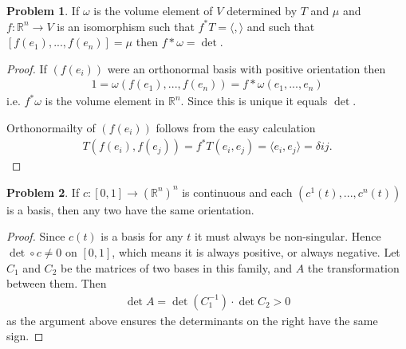\documentclass[20pt]{article}
\theoremstyle{plain}
\theoremstyle{definition}
\newtheorem*{problem}{Problem}
\newcommand{\reals}{\mathbb{R}}
\begin{document}
\begin{problem}{4.4}
  If $\omega$ is the volume element of $V$ determined by $T$ and $\mu$ and
  $f: \reals^n \to V$ is an isomorphism such that $f^*T = \langle, \rangle$ and such that 
  $[f(e_1), ..., f(e_n)] = \mu$ then $f*\omega = \det.$
\end{problem}

\begin{proof}
  If $(f(e_i))$ were an orthonormal basis with positive orientation then 
  \begin{align*}
    1 = \omega( f(e_1), ..., f(e_n) ) = f*\omega(e_1, ..., e_n)
  \end{align*}
  i.e. $f^*\omega$ is the volume element in $\reals^n$.  Since this is unique it equals $\det$.

  Orthonormailty of $(f(e_i))$ follows from the easy calculation
  \begin{align*}
    T(f(e_i), f(e_j)) = f^*T(e_i, e_j) = \langle e_i, e_j \rangle = \delta{ij}.
  \end{align*}
\end{proof}




























\begin{problem}{4.5}
    If $c: [0, 1] \to (\reals^n)^n$ is continuous and each $(c^1(t), ..., c^n(t))$ is a basis, 
    then any two have the same orientation. 
\end{problem}

\begin{proof}
  Since $c(t)$ is a basis for any $t$ it must always be non-singular.
  Hence $\det \circ c \neq 0$ on $[0, 1]$, which means it is always 
  positive, or always negative.
  Let $C_1$ and $C_2$ be the matrices of two bases in this family, and $A$ the transformation between them. 
  Then 
  \begin{align*}
    \det A = \det(C^{-1}_1) \cdot \det C_2 > 0
  \end{align*}
  as the argument above ensures the determinants on the right have the same sign.
\end{proof}
\end{document}
